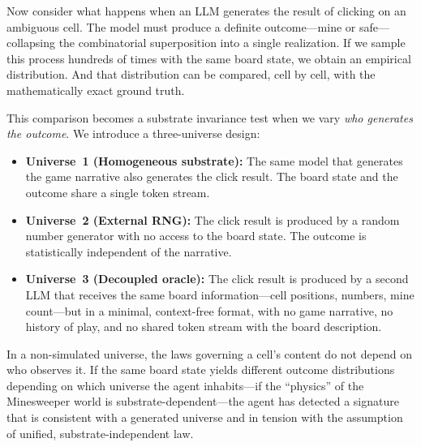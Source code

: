 \documentclass[12pt,a4paper]{article}
\begin{document}
Now consider what happens when an LLM generates the result of clicking on an ambiguous cell. The model must produce a definite outcome---mine or safe---collapsing the combinatorial superposition into a single realization. If we sample this process hundreds of times with the same board state, we obtain an empirical distribution. And that distribution can be compared, cell by cell, with the mathematically exact ground truth.

This comparison becomes a substrate invariance test when we vary \emph{who generates the outcome}. We introduce a three-universe design:

\begin{itemize}[nosep]
    \item \textbf{Universe~1 (Homogeneous substrate):} The same model that generates the game narrative also generates the click result. The board state and the outcome share a single token stream.
    \item \textbf{Universe~2 (External RNG):} The click result is produced by a random number generator with no access to the board state. The outcome is statistically independent of the narrative.
    \item \textbf{Universe~3 (Decoupled oracle):} The click result is produced by a second LLM that receives the same board information---cell positions, numbers, mine count---but in a minimal, context-free format, with no game narrative, no history of play, and no shared token stream with the board description.
\end{itemize}

In a non-simulated universe, the laws governing a cell's content do not depend on who observes it. If the same board state yields different outcome distributions depending on which universe the agent inhabits---if the ``physics'' of the Minesweeper world is substrate-dependent---the agent has detected a signature that is consistent with a generated universe and in tension with the assumption of unified, substrate-independent law.
\end{document}

